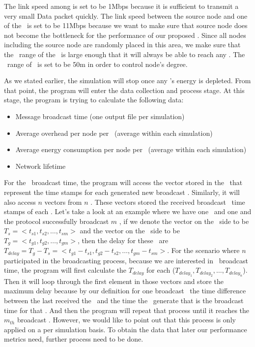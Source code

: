 The link speed among \gns is set to be 1Mbps because it is sufficient to transmit a very small Data packet quickly. The link speed between the source node and one of the \gn ~is set to be 11Mbps because we want to make sure that source node does not become the bottleneck for the performance of our proposed \gp. Since all nodes including the source node are randomly placed in this area, we make sure that the \wf ~range of the \sn ~is large enough that it will always be able to reach any \gns. The \wf ~range of \gns ~is set to be 50m in order to control node's degree. 

As we stated earlier, the simulation will stop once any \gn's energy is depleted. From that point, the program will enter the data collection and process stage. At this stage, the program is trying to calculate the following data:

\begin{itemize}
	\item Message broadcast time (one output file per simulation)
	\item Average overhead per node per \msg ~(average within each simulation)
	\item Average energy consumption per node per \msg ~(average within each simulation)
	\item Network lifetime
\end{itemize}

For the \msg ~broadcast time, the program will access the vector stored in the \sn ~that represent the time stamps for each generated new broadcast \msg. Similarly, it will also access $n$ vectors from $n$ \gns. These vectors stored the received broadcast \msg ~time stamps of each \gn. Let's take a look at an example where we have one \sn ~and one \gn and the protocol successfully broadcast $m$ \msgs, if we denote the vector on the \sn ~side to be $T_s=<t_{s1}, t_{s2}, \ldots, t_{sm}>$ and the vector on the \gn ~side to be $T_g=<t_{g1}, t_{g2}, \ldots, t_{gm}>$, then the delay for these \msgs ~are $T_{delay}= T_g - T_s = <t_{g1}-t_{s1}, t_{g2}-t_{s2}, \ldots, t_{gm}-t_{sm}>$. For the scenario where $n$ \gns participated in the broadcasting process, because we are interested in \msg ~broadcast time, the program will first calculate the $T_{delay}$ for each \gn ($T_{delay_1},T_{delay_2},\ldots,T_{delay_n} $). Then it will loop through the first element in those vectors and store the maximum delay because by our definition for one broadcast \msg ~the time difference between the last \gn received the \msg ~and the time the \sn ~generate that \msg is the broadcast time for that \msg. And then the program will repeat that process until it reaches the $m_{th}$ broadcast \msg. However, we would like to point out that this process is only applied on a per simulation basis. To obtain the data that later our performance metrics need, further process need to be done.

